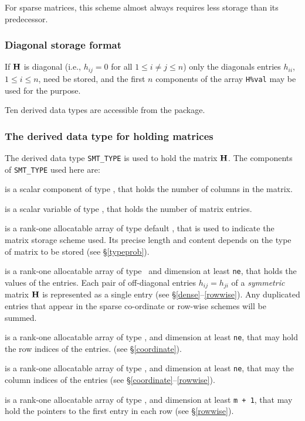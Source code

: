 \documentclass{galahad}
\begin{document}
For sparse matrices, this scheme almost always requires less storage than 
its predecessor.

\subsubsection{Diagonal storage format}\label{diagonal}
If ${\mathbf{H}}$ is diagonal (i.e., $h_{ij} = 0$ for all $1 \leq i \neq j \leq n$)
only the diagonals entries $h_{ii}$, $1 \leq i \leq n$,  need be stored,
and the first $n$ components of the array {\tt H\%val} may be used for 
the purpose. 





\galtypes
Ten derived data types are accessible from the package.


\subsubsection{The derived data type for holding matrices}\label{typesmt}
The derived data type {\tt SMT\_TYPE} is used to hold the matrix ${\mathbf{H}}$. 
The components of {\tt SMT\_TYPE} used here are:

\begin{description}

 is a scalar component of type \integer, 
that holds the number of columns in the matrix. 
 
 is a scalar variable of type \integer, that
holds the number of matrix entries.

 is a rank-one allocatable array of type default \character, that
is used to indicate the matrix storage scheme used. Its precise length and
content depends on the type of matrix to be stored (see \S\ref{typeprob}).

 is a rank-one allocatable array of type \realdp\, 
and dimension at least {\tt ne}, that holds the values of the entries. 
Each pair of off-diagonal entries $h_{ij} = h_{ji}$ of a {\em symmetric}
matrix ${\mathbf{H}}$ is represented as a single entry 
(see \S\ref{dense}--\ref{rowwise}).
Any duplicated entries that appear in the sparse 
co-ordinate or row-wise schemes will be summed. 

 is a rank-one allocatable array of type \integer, 
and dimension at least {\tt ne}, that may hold the row indices of the entries. 
(see \S\ref{coordinate}).

 is a rank-one allocatable array of type \integer, 
and dimension at least {\tt ne}, that may the column indices of the entries
(see \S\ref{coordinate}--\ref{rowwise}).

 is a rank-one allocatable array of type \integer, 
and dimension at least {\tt m + 1}, that may hold the pointers to
the first entry in each row (see \S\ref{rowwise}).

\end{description}
\end{document}
